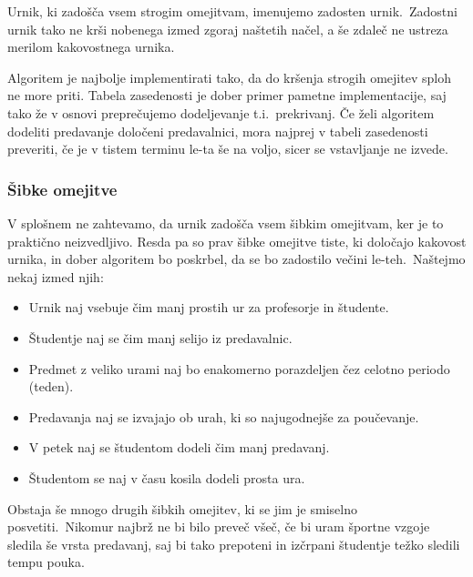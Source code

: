 \documentclass[a4paper,10pt]{article}
\begin{document}
\noindent Urnik, ki zadošča vsem strogim omejitvam, imenujemo zadosten urnik.\ Zadostni urnik tako ne
krši nobenega izmed zgoraj naštetih načel, a še zdaleč ne ustreza merilom kakovostnega urnika.

Algoritem je najbolje implementirati tako, da do kršenja strogih omejitev sploh ne more priti.
Tabela zasedenosti je dober primer pametne implementacije, saj tako že v osnovi  preprečujemo
dodeljevanje t.i.\ prekrivanj. Če želi algoritem dodeliti predavanje določeni predavalnici,
mora najprej v tabeli zasedenosti preveriti, če je v tistem terminu le-ta še na voljo,
sicer se vstavljanje ne izvede.

\subsubsection{Šibke omejitve}

V splošnem ne zahtevamo, da urnik zadošča vsem šibkim omejitvam, ker je to praktično neizvedljivo.
Resda pa so prav šibke omejitve tiste, ki določajo kakovost urnika, in dober algoritem bo
poskrbel, da se bo zadostilo večini le-teh.\ Naštejmo nekaj izmed njih:

\begin{itemize}
   \item Urnik naj vsebuje čim manj prostih ur za profesorje in študente.
  \item Študentje naj se čim manj selijo iz predavalnic.
  \item Predmet z veliko urami naj bo enakomerno porazdeljen čez celotno periodo (teden).
   \item Predavanja naj se izvajajo ob urah, ki so najugodnejše za poučevanje.
  \item V petek naj se študentom dodeli čim manj predavanj.
 \item  Študentom se naj v času kosila dodeli prosta ura.
\end{itemize}

\noindent Obstaja še mnogo drugih šibkih omejitev, ki se jim je smiselno posvetiti.\ Nikomur najbrž ne
bi bilo preveč všeč, če bi uram športne vzgoje sledila še vrsta predavanj, saj bi tako
prepoteni in izčrpani študentje težko sledili tempu pouka.
\end{document}
